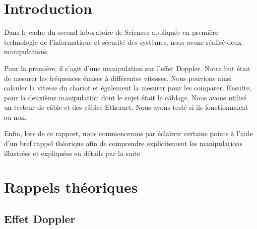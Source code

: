 \documentclass[a4paper]{article}
\begin{document}
\let\cleardoublepage\clearpage















\section{Introduction}





Dans le cadre du second laboratoire de Sciences appliquée en première technologie de l’informatique et sécurité des systèmes, nous avons réalisé deux manipulations.

Pour la première, il s’agit d’une manipulation sur l’effet Doppler. Notre but était de mesurer les fréquences émises à différentes vitesses. Nous pouvions ainsi calculer la vitesse du chariot et également la mesurer pour les comparer. Ensuite, pour la deuxième manipulation dont le sujet était le câblage. Nous avons utilisé un testeur de câble et des câbles Ethernet. Nous avons testé si ils fonctionnaient ou non.

Enfin, lors de ce rapport, nous commencerons par éclaircir certains points à l’aide d’un bref rappel théorique afin de comprendre explicitement les manipulations illustrées et expliquées en détails par la suite. 















\section{Rappels théoriques}










\subsection{Effet Doppler}
\end{document}
